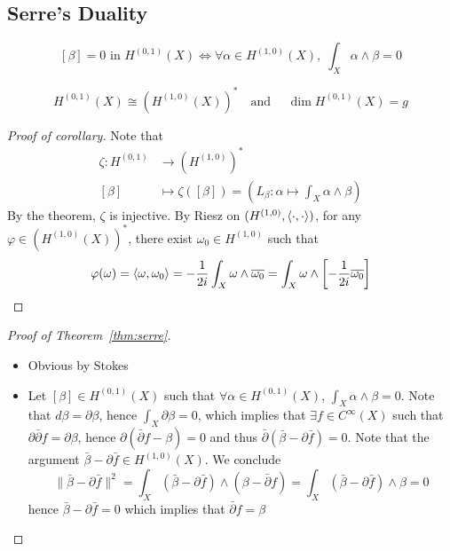 \subsection{Serre's Duality}
\begin{theorem}{}\label{thm:serre}
    \[
      \left[ \beta \right] = 0 \text{ in } H^{{(0,1)}}{(X)} \iff \forall \alpha
      \in H^{{(1,0)}}{(X)}, \; \int_X \alpha \wedge \beta = 0
    \]
\end{theorem}
\begin{corollary}{}
    \[
      H^{{(0,1)}}{(X)} \cong {\left( H^{{(1,0)}}{(X)} \right)}^{*} \quad \text{
      and } \quad \dim H^{{(0,1)}}{(X)} = g
    \]
\end{corollary}
\begin{proof}[Proof of corollary]
    Note that \begin{align*}
        \zeta : H^{{(0,1)}} &\longrightarrow {\left( H^{{(1,0)}} \right)} ^{*} \\
        [\beta] &\longmapsto \zeta ([\beta]) = \left(L_\beta : \alpha \mapsto \int_X
        \alpha \wedge \beta \right)
    \end{align*}
    By the theorem, \(\zeta\) is injective. By Riesz on \({(H^{{(1,0)}},
    {\left\langle\cdot , \cdot \right\rangle} )}\), for any \(\varphi  \in {\left( H^{{(1,0)}}{(X)}
    \right)}^{*} \), there exist \(\omega_{0} \in H^{{(1,0)}}\) such that
    \[
      \varphi {(\omega)} = {\left\langle\omega, \omega_{0}\right\rangle} = -\frac{1}{2i} \int_X
      \omega \wedge \overline{\omega_{0}} = \int_X \omega \wedge \left[
      -\frac{1}{2i} \overline{\omega_{0}} \right] 
    \]
\end{proof}
\begin{proof}[Proof of Theorem~\ref{thm:serre}]
    \begin{itemize}
        \item[\(\implies \)] Obvious by Stokes
        \item[\(\impliedby \)] Let \([\beta] \in H^{{(0,1)}}{(X)}\) such that
            \(\forall \alpha \in H^{{(0,1)}}{(X)}\), \(\int_X \alpha \wedge
            \beta = 0\). Note that \(d \beta = \partial \beta\), hence \(\int_X
            \partial \beta = 0\), which implies that \(\exists f \in
            C^{\infty}{(X)}\) such that \(\partial \bar{\partial} f = \partial
            \beta\), hence \(\partial {(\bar{\partial}f - \beta)} = 0\) and thus
            \(\bar{\partial} {(\bar{\beta} - \partial \bar{f})} = 0\). Note that
            the argument \(\bar{\beta} - \partial \bar{f} \in
            H^{{(1,0)}}{(X)}\). We conclude
            \[
              \|\bar{\beta} - \partial \bar{f}\|^2 =  \int_X {\left( \bar{\beta}
                      - \partial \bar{f} \right)} \wedge {\left( \beta -
                      \bar{\partial} f \right)} = \int_X {\left( \bar{\beta} -
              \partial \bar{f} \right)} \wedge \beta = 0
            \]
            hence \(\bar{\beta} - \partial \bar{f} = 0\) which implies that
            \(\bar{\partial}f = \beta\) 
    \end{itemize}
\end{proof}

